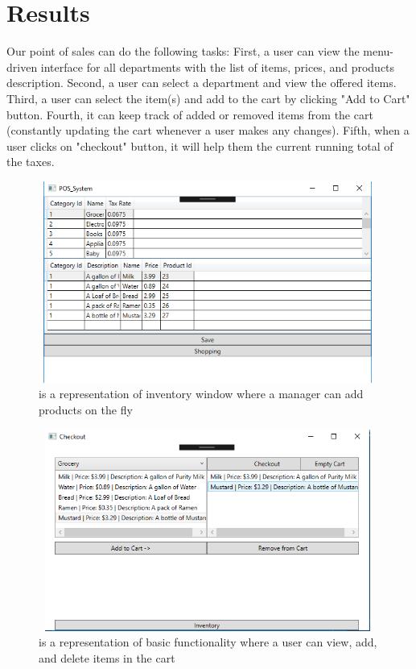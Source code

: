 \documentclass[10pt,conference,onecolumn,compsoc]{IEEEtran}
\begin{document}
\section{Results}
Our point of sales can do the following tasks: First, a user can view the menu-driven interface for all departments with the list of items, prices, and products description. Second, a user can select a department and view the offered items. Third, a user can select the item(s) and add to the cart by clicking "Add to Cart" button. Fourth, it can keep track of added or removed items from the cart (constantly updating the cart whenever a user makes any changes). Fifth, when a user clicks on "checkout" button, it will help them the current running total of the taxes.
 \\

\begin{figure}[H]
\includegraphics[height=250px, width=420px]{inventory.png}
\caption{is a representation of inventory window where a manager can add products on the fly}
\label{inventory}
\end{figure}

\begin{figure}[H]
\includegraphics[height=250px, width=420px]{basicFunc.png}
\caption{is a representation of basic functionality where a user can view, add, and delete items in the cart}
\label{basicfun}
\end{figure}
\end{document}
